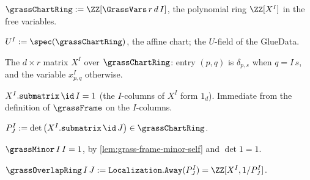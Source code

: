 \begin{definition}
  \label{def:grass-chart-ring}
  $\grassChartRing := \ZZ[\GrassVars\,r\,d\,I]$, the polynomial ring
  $\ZZ[X^I]$ in the free variables.
\end{definition}

\begin{definition}
  \label{def:grass-chart-scheme}
  $U^I := \spec(\grassChartRing)$, the affine chart; the $U$-field of the
  GlueData.
\end{definition}

\begin{definition}
  \label{def:grass-frame}
  The $d\times r$ matrix $X^I$ over $\grassChartRing$: entry $(p,q)$ is
  $\delta_{p,s}$ when $q = I\,s$, and the variable $x^I_{p,q}$ otherwise.
\end{definition}

\begin{lemma}
  \label{lem:grass-frame-minor-self}
  $X^I.\mathtt{submatrix}\,\id\,I = 1$ (the $I$-columns of $X^I$ form $1_{d}$).
  Immediate from the definition of $\grassFrame$ on the $I$-columns.
\end{lemma}

\begin{definition}
  \label{def:grass-minor}
  $P^I_J := \det\big(X^I.\mathtt{submatrix}\,\id\,J\big)\in\grassChartRing$.
\end{definition}

\begin{lemma}\leanok
[$P^I_I = 1$]
  \label{lem:grass-minor-self}
  $\grassMinor\,I\,I = 1$, by \cref{lem:grass-frame-minor-self} and
  $\det 1 = 1$.
\end{lemma}

\begin{definition}
  \label{def:grass-overlap-ring}
  $\grassOverlapRing\,I\,J := \mathtt{Localization.Away}(P^I_J) =
  \ZZ[X^I, 1/P^I_J]$.
\end{definition}

